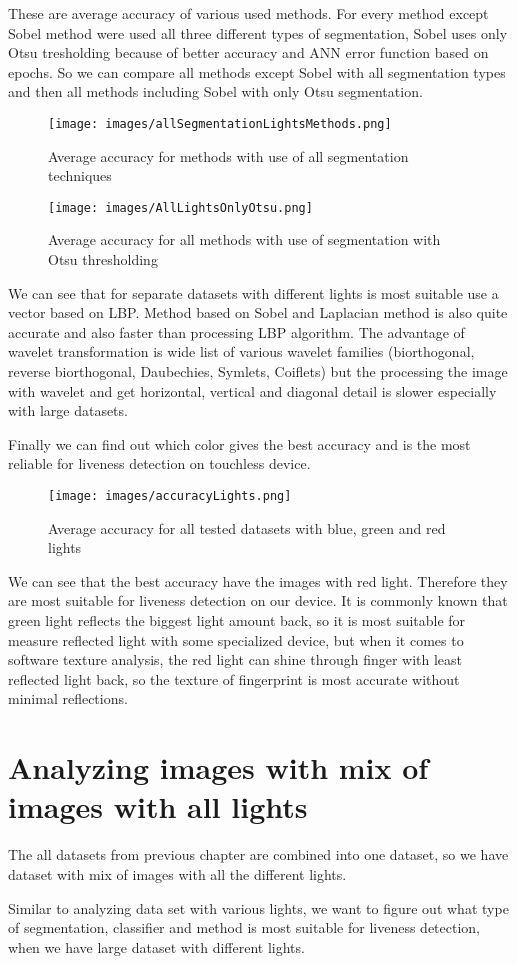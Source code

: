 \documentclass{article}
\begin{document}
These are average accuracy of various used methods. For every method except Sobel method were used all three different types of segmentation, Sobel uses only Otsu tresholding because of better accuracy and ANN error function based on epochs. So we can compare all methods except Sobel with all segmentation types and then all methods including Sobel with only Otsu segmentation.

\begin{figure}[!htbp]
    \centering
    \texttt{[image: images/allSegmentationLightsMethods.png]}
    \caption{Average accuracy for methods with use of all segmentation techniques}
\end{figure}

\begin{figure}[!htbp]
    \centering
    \texttt{[image: images/AllLightsOnlyOtsu.png]}
    \caption{Average accuracy for all methods with use of segmentation with Otsu thresholding}
\end{figure}

We can see that for separate datasets with different lights is most suitable use a vector based on LBP. Method based on Sobel and Laplacian method is also quite accurate and also faster than processing LBP algorithm. The advantage of wavelet transformation is wide list of various wavelet families (biorthogonal, reverse biorthogonal, Daubechies, Symlets, Coiflets) but the processing the image with wavelet and get horizontal, vertical and diagonal detail is slower especially with large datasets.

Finally we can find out which color gives the best accuracy and is the most reliable for liveness detection on touchless device.

\begin{figure}[!htbp]
    \centering
    \texttt{[image: images/accuracyLights.png]}
    \caption{Average accuracy for all tested datasets with blue, green and red lights}
\end{figure}

We can see that the best accuracy have the images with red light. Therefore they are most suitable for liveness detection on our device. It is commonly known that green light reflects the biggest light amount back, so it is most suitable for measure reflected light with some specialized device, but when it comes to software texture analysis, the red light can shine through finger with least reflected light back, so the texture of fingerprint is most accurate without minimal reflections.

\section{Analyzing images with mix of images with all lights}
The all datasets from previous chapter are combined into one dataset, so we have dataset with mix of images with all the different lights.

Similar to analyzing data set with various lights, we want to figure out what type of segmentation, classifier and method is most suitable for liveness detection, when we have large dataset with different lights.
\end{document}

